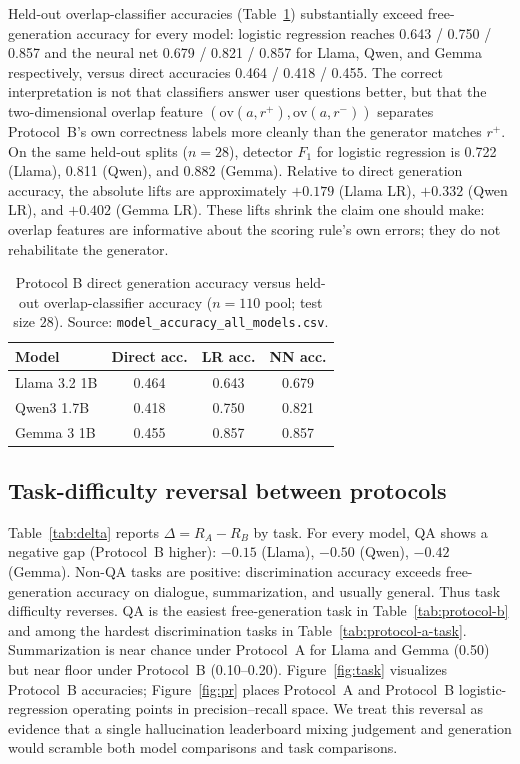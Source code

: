 \documentclass[11pt]{article}
\begin{document}
Held-out overlap-classifier accuracies (Table~\ref{tab:clf}) substantially
exceed free-generation accuracy for every model: logistic regression reaches
0.643 / 0.750 / 0.857 and the neural net 0.679 / 0.821 / 0.857 for Llama, Qwen,
and Gemma respectively, versus direct accuracies 0.464 / 0.418 / 0.455. The
correct interpretation is not that classifiers answer user questions better, but
that the two-dimensional overlap feature
$(\mathrm{ov}(a,r^+),\mathrm{ov}(a,r^-))$ separates Protocol~B's own
correctness labels more cleanly than the generator matches $r^+$. On the same
held-out splits ($n=28$), detector $F_1$ for logistic regression is 0.722
(Llama), 0.811 (Qwen), and 0.882 (Gemma). Relative to direct generation
accuracy, the absolute lifts are approximately $+0.179$ (Llama LR), $+0.332$
(Qwen LR), and $+0.402$ (Gemma LR). These lifts shrink the claim one should make:
overlap features are informative about the scoring rule's own errors; they do
not rehabilitate the generator.

\begin{table}[t]
\centering
\caption{Protocol B direct generation accuracy versus held-out overlap-classifier accuracy ($n=110$ pool; test size $28$). Source: \texttt{model\_accuracy\_all\_models.csv}.}
\label{tab:clf}
\begin{tabular}{lccc}
\toprule
Model & Direct acc. & LR acc. & NN acc. \\
\midrule
Llama 3.2 1B & 0.464 & 0.643 & 0.679 \\
Qwen3 1.7B & 0.418 & 0.750 & 0.821 \\
Gemma 3 1B & 0.455 & 0.857 & 0.857 \\
\bottomrule
\end{tabular}
\end{table}

\subsection{Task-difficulty reversal between protocols}

Table~\ref{tab:delta} reports $\Delta=R_A-R_B$ by task. For every model, QA
shows a negative gap (Protocol~B higher): $-0.15$ (Llama), $-0.50$ (Qwen),
$-0.42$ (Gemma). Non-QA tasks are positive: discrimination accuracy exceeds
free-generation accuracy on dialogue, summarization, and usually general. Thus
task difficulty reverses. QA is the easiest free-generation task in Table~\ref{tab:protocol-b}
and among the hardest discrimination tasks in Table~\ref{tab:protocol-a-task}.
Summarization is near chance under Protocol~A for Llama and Gemma (0.50) but
near floor under Protocol~B (0.10--0.20). Figure~\ref{fig:task} visualizes
Protocol~B accuracies; Figure~\ref{fig:pr} places Protocol~A and Protocol~B
logistic-regression operating points in precision--recall space. We treat this
reversal as evidence that a single hallucination leaderboard mixing judgement
and generation would scramble both model comparisons and task comparisons.
\end{document}
